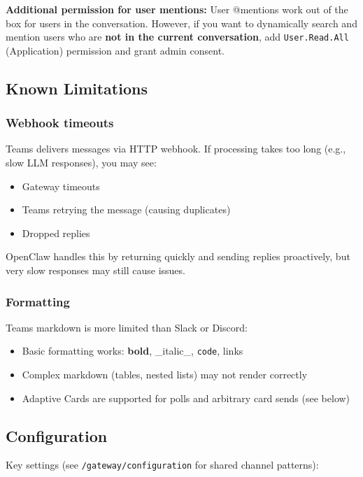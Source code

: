 \textbf{Additional permission for user mentions:} User @mentions work out of the box for users in the conversation. However, if you want to dynamically search and mention users who are \textbf{not in the current conversation}, add \texttt{User.Read.All} (Application) permission and grant admin consent.

\subsection{Known Limitations}


\subsubsection{Webhook timeouts}


Teams delivers messages via HTTP webhook. If processing takes too long (e.g., slow LLM responses), you may see:

\begin{itemize}
  \item Gateway timeouts
  \item Teams retrying the message (causing duplicates)
  \item Dropped replies
\end{itemize}


OpenClaw handles this by returning quickly and sending replies proactively, but very slow responses may still cause issues.

\subsubsection{Formatting}


Teams markdown is more limited than Slack or Discord:

\begin{itemize}
  \item Basic formatting works: \textbf{bold}, \_italic\_, \texttt{code}, links
  \item Complex markdown (tables, nested lists) may not render correctly
  \item Adaptive Cards are supported for polls and arbitrary card sends (see below)
\end{itemize}


\subsection{Configuration}


Key settings (see \texttt{/gateway/configuration} for shared channel patterns):

